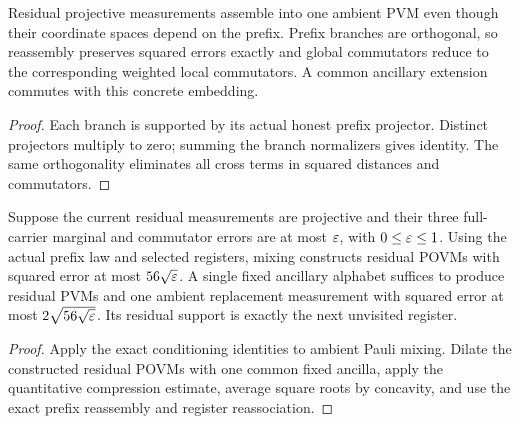 \begin{lemma}
\label{lem:intro-adaptive-reassembly}
\leanok
Residual projective measurements assemble into one ambient PVM even though their coordinate spaces depend on the prefix. Prefix branches are orthogonal, so reassembly preserves squared errors exactly and global commutators reduce to the corresponding weighted local commutators. A common ancillary extension commutes with this concrete embedding.
\end{lemma}
\begin{proof}
\leanok
Each branch is supported by its actual honest prefix projector. Distinct projectors multiply to zero; summing the branch normalizers gives identity. The same orthogonality eliminates all cross terms in squared distances and commutators.
\end{proof}

\begin{lemma}
\label{lem:intro-adaptive-extraction}
\leanok
Suppose the current residual measurements are projective and their three full-carrier marginal and commutator errors are at most $\varepsilon$, with $0\leq\varepsilon\leq1$. Using the actual prefix law and selected registers, mixing constructs residual POVMs with squared error at most $56\sqrt{\varepsilon}$. A single fixed ancillary alphabet suffices to produce residual PVMs and one ambient replacement measurement with squared error at most $2\sqrt{56\sqrt{\varepsilon}}$. Its residual support is exactly the next unvisited register.
\end{lemma}
\begin{proof}
\leanok
Apply the exact conditioning identities to ambient Pauli mixing. Dilate the constructed residual POVMs with one common fixed ancilla, apply the quantitative compression estimate, average square roots by concavity, and use the exact prefix reassembly and register reassociation.
\end{proof}

